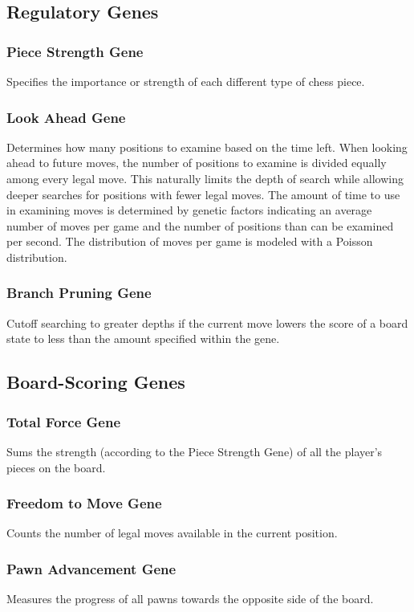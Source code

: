 \documentclass[letter]{article}
\renewcommand\_{\textunderscore\allowbreak}
\begin{document}
\subsection{Regulatory Genes}
\subsubsection{Piece Strength Gene}
Specifies the importance or strength of each different type of chess piece.

\subsubsection{Look Ahead Gene}
Determines how many positions to examine based on the time left. When looking ahead to future moves, the number of positions to examine is divided equally among every legal move. This naturally limits the depth of search while allowing deeper searches for positions with fewer legal moves. The amount of time to use in examining moves is determined by genetic factors indicating an average number of moves per game and the number of positions than can be examined per second. The distribution of moves per game is modeled with a Poisson distribution.

\subsubsection{Branch Pruning Gene}
Cutoff searching to greater depths if the current move lowers the score of a board state to less than the amount specified within the gene.

\subsection{Board-Scoring Genes}
\subsubsection{Total Force Gene}
Sums the strength (according to the Piece Strength Gene) of all the player's pieces on the board.

\subsubsection{Freedom to Move Gene}
Counts the number of legal moves available in the current position.

\subsubsection{Pawn Advancement Gene}
Measures the progress of all pawns towards the opposite side of the board.
\end{document}
